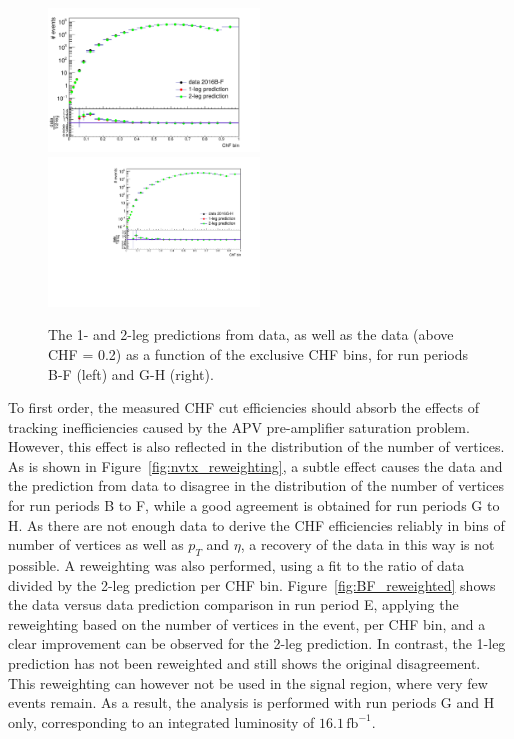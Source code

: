 \begin{figure}[ht]
  \centering
  \includegraphics[width=0.5\textwidth]{figures/data_vs_prediction_BF_filters.pdf}\hfill%
  \includegraphics[width=0.5\textwidth]{figures/data_vs_prediction_GH_filters.pdf}
  \caption{The 1- and 2-leg predictions from data, as well as the data (above CHF = 0.2) as a function of the exclusive CHF bins, for run periods B-F (left) and G-H (right).}
  \label{fig:prediction}
\end{figure}

To first order, the measured CHF cut efficiencies should absorb the effects of tracking inefficiencies caused by the APV pre-amplifier saturation problem. However, this effect is also reflected in the distribution of the number of vertices. As is shown in Figure~\ref{fig:nvtx_reweighting}, a subtle effect causes the data and the prediction from data to disagree in the distribution of the number of vertices for run periods B to F, while a good agreement is obtained for run periods G to H. As there are not enough data to derive the CHF efficiencies reliably in bins of number of vertices as well as $p_T$ and $\eta$, a recovery of the data in this way is not possible. A reweighting was also performed, using a fit to the ratio of data divided by the 2-leg prediction per CHF bin. Figure~\ref{fig:BF_reweighted} shows the data versus data prediction comparison in run period E, applying the reweighting based on the number of vertices in the event, per CHF bin, and a clear improvement can be observed for the 2-leg prediction. In contrast, the 1-leg prediction has not been reweighted and still shows the original disagreement. This reweighting can however not be used in the signal region, where very few events remain. As a result, the analysis is performed with run periods G and H only, corresponding to an integrated luminosity of $16.1\,\mathrm{fb^{-1}}$.


